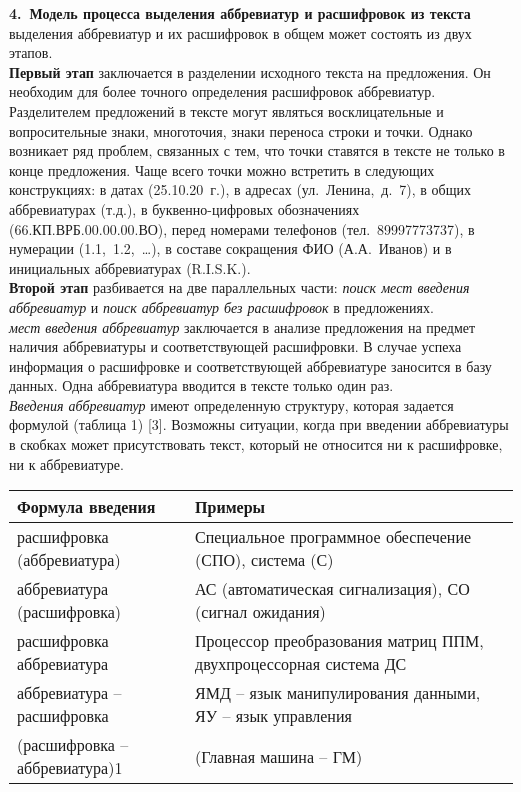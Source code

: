 \documentclass[a4paper, 12pt]{article}
\begin{document}
\indent\textbf{4. Модель процесса выделения аббревиатур и расшифровок из текста}\\
 выделения аббревиатур и их расшифровок в общем может состоять из двух этапов.\\
\indent\textbf{Первый этап} заключается в разделении исходного текста на предложения. Он необходим для более точного определения расшифровок аббревиатур. Разделителем предложений в тексте могут являться восклицательные и вопросительные знаки, многоточия, знаки переноса строки и точки. Однако возникает ряд проблем, связанных с тем, что точки ставятся в тексте не только в конце предложения. Чаще всего точки можно встретить в следующих конструкциях: в датах (25.10.20 г.), в адресах (ул. Ленина, д. 7), в общих аббревиатурах (т.д.), в буквенно-цифровых обозначениях (66.КП.ВРБ.00.00.00.ВО), перед номерами телефонов (тел. 89997773737), в нумерации (1.1, 1.2, …), в составе сокращения ФИО (А.А. Иванов) и в инициальных аббревиатурах (R.I.S.K.).\\
\indent\textbf{Второй этап} разбивается на две параллельных части: \textit{поиск мест введения аббревиатур} и \textit{поиск аббревиатур без расшифровок} в предложениях.\\
 \textit{мест введения аббревиатур} заключается в анализе предложения на предмет наличия аббревиатуры и соответствующей расшифровки. В случае успеха информация о расшифровке и соответствующей аббревиатуре заносится в базу данных. Одна аббревиатура вводится в тексте только один раз.\\
\indent\textit{Введения аббревиатур} имеют определенную структуру, которая задается формулой (таблица 1) [3]. Возможны ситуации, когда при введении аббревиатуры в скобках может присутствовать текст, который не относится ни к расшифровке, ни к аббревиатуре.\\
\begin{center}
    \begin{tabular}{|p{5cm}|p{6cm}|}
        \hline
        Формула введения & Примеры \\
        \hline
        расшифровка (аббревиатура) & Специальное программное обеспечение (СПО), система (С)\\
        \hline
        аббревиатура (расшифровка) & АС (автоматическая сигнализация), СО (сигнал ожидания)\\
        \hline
        расшифровка аббревиатура & Процессор преобразования матриц ППМ, двухпроцессорная система ДС\\
        \hline
        аббревиатура – расшифровка & ЯМД – язык манипулирования данными, ЯУ – язык управления\\
        \hline
        (расшифровка – аббревиатура)1 & (Главная машина – ГМ) \\
        \hline
    \end{tabular}
\end{center}
\end{document}
